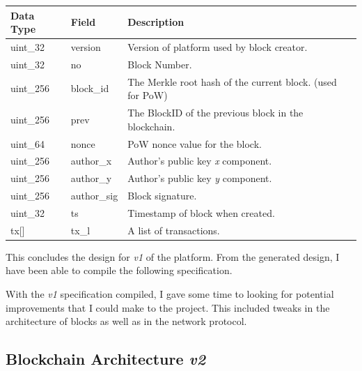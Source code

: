 \documentclass{article}
\begin{document}
\begin{table}[H]
\centering
\begin{tabular}{|p{1.3cm}|p{2.5cm}|p{5.5cm}|}
\hline
\rowcolor{tblgrey} 
Data Type   & Field      & Description                            \\ \hline
uint\_32    & version     & Version of platform used by block creator.          \\ \hline
uint\_32    & no          & Block Number.                                       \\ \hline
uint\_256   & block\_id   & The Merkle root hash of the current block. (used for PoW)  \\ \hline
uint\_256   & prev        & The BlockID of the previous block in the blockchain.   \\ \hline
uint\_64    & nonce       & PoW nonce value for the block.                      \\ \hline
uint\_256   & author\_x   & Author's public key \textit{x} component.           \\ \hline
uint\_256   & author\_y   & Author's public key \textit{y} component.           \\ \hline
uint\_256   & author\_sig & Block signature.                                    \\ \hline
uint\_32    & ts          & Timestamp of block when created.                    \\ \hline
tx[\hspace{0.05cm}] & tx\_l       & A list of transactions.                            \\ \hline
\end{tabular}
\end{table}


This concludes the design for \textit{v1} of the platform. From the generated design, I have been able to compile the following specification.



With the \textit{v1} specification compiled, I gave some time to looking for potential improvements that I could make to the project. This included tweaks in the architecture of blocks as well as in the network protocol.

\subsection{Blockchain Architecture \textit{v2}}
\end{document}
